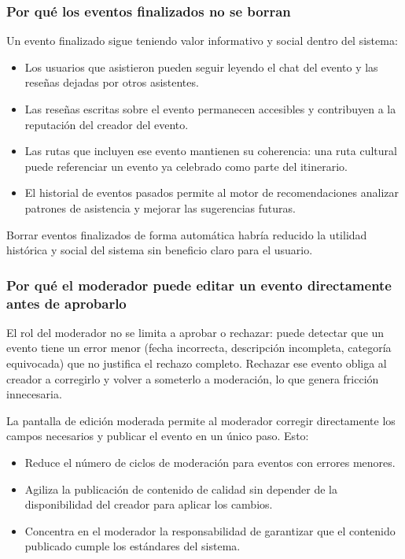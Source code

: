 \subsubsection{Por qué los eventos finalizados no se borran}

Un evento finalizado sigue teniendo valor informativo y social dentro del sistema:

\begin{itemize}
    \item Los usuarios que asistieron pueden seguir leyendo el chat del evento y las reseñas dejadas por otros asistentes.
    \item Las reseñas escritas sobre el evento permanecen accesibles y contribuyen a la reputación del creador del evento.
    \item Las rutas que incluyen ese evento mantienen su coherencia: una ruta cultural puede referenciar un evento ya celebrado como parte del itinerario.
    \item El historial de eventos pasados permite al motor de recomendaciones analizar patrones de asistencia y mejorar las sugerencias futuras.
\end{itemize}

Borrar eventos finalizados de forma automática habría reducido la utilidad histórica y social del sistema sin beneficio claro para el usuario.

\subsubsection{Por qué el moderador puede editar un evento directamente antes de aprobarlo}

El rol del moderador no se limita a aprobar o rechazar: puede detectar que un evento tiene un error menor (fecha incorrecta, descripción incompleta, categoría equivocada) que no justifica el rechazo completo. Rechazar ese evento obliga al creador a corregirlo y volver a someterlo a moderación, lo que genera fricción innecesaria.

La pantalla de edición moderada permite al moderador corregir directamente los campos necesarios y publicar el evento en un único paso. Esto:

\begin{itemize}
    \item Reduce el número de ciclos de moderación para eventos con errores menores.
    \item Agiliza la publicación de contenido de calidad sin depender de la disponibilidad del creador para aplicar los cambios.
    \item Concentra en el moderador la responsabilidad de garantizar que el contenido publicado cumple los estándares del sistema.
\end{itemize}

